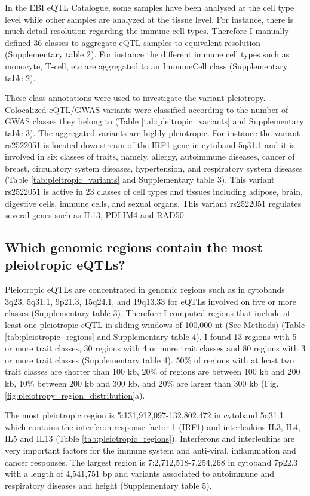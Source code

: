 In the EBI eQTL Catalogue, some samples have been analysed at the cell type level while other samples are analyzed at the tissue level.
%
For instance, there is much detail resolution regarding the immune cell types.
%
Therefore I manually defined 36 classes to aggregate eQTL samples to equivalent resolution (Supplementary table 2).
%
For instance the different immune cell types such as monocyte, T-cell, etc are aggregated to an ImmuneCell class (Supplementary table 2).

These class annotations were used to investigate the variant pleiotropy.
%
Colocalized eQTL/GWAS variants were classified according to the number of GWAS classes they belong to (Table \ref{tab:pleitropic_variants} and Supplementary table 3).
%
The aggregated variants are highly pleiotropic.
%
For instance the variant rs2522051 is located downstream of the IRF1 gene in cytoband 5q31.1 and it is involved in six classes of traits, namely,
allergy, autoimmune diseases, cancer of breast, circulatory system diseases, hypertension, and respiratory system diseases
(Table \ref{tab:pleitropic_variants} and Supplementary table 3).
%
This variant rs2522051 is active in 23 classes of cell types and tissues including adipose, brain, digestive cells, immune cells, and sexual organs.
%
This variant rs2522051 regulates several genes such as IL13, PDLIM4 and RAD50.

\subsection*{Which genomic regions contain the most pleiotropic eQTLs?}

Pleiotropic eQTLs are concentrated in genomic regions such as in cytobands 3q23,
5q31.1, 9p21.3, 15q24.1, and 19q13.33 for eQTLs involved on five or more classes (Supplementary table 3).
%
Therefore I computed regions that include at least one pleiotropic eQTL in
sliding windows of 100,000 nt (See Methods) (Table \ref{tab:pleiotropic_regions} and Supplementary table 4).
%
I found 13 regions with 5 or more trait classes, 30 regions with 4 or more trait
classes and 80 regions with 3 or more trait classes (Supplementary table 4).
%
50\% of regions with at least two trait classes are shorter than 100 kb, 20\% of regions are
between 100 kb and 200 kb, 10\% between 200 kb and 300 kb, and 20\% are larger than 300 kb (Fig. \ref{fig:pleiotropy_region_distribution}a).

The most pleiotropic region is 5:131,912,097-132,802,472 in cytoband 5q31.1 which contains the interferon response factor 1 (IRF1) and interleukins IL3, IL4, IL5 and IL13 (Table \ref{tab:pleiotropic_regions}).
%
Interferons and interleukins are very important factors for the immune system and anti-viral, inflammation and cancer responses.
%
The largest region is 7:2,712,518-7,254,268 in cytoband 7p22.3 with a length of 4,541,751 bp and variants associated to autoimmune and respiratory diseases and height (Supplementary table 5).


